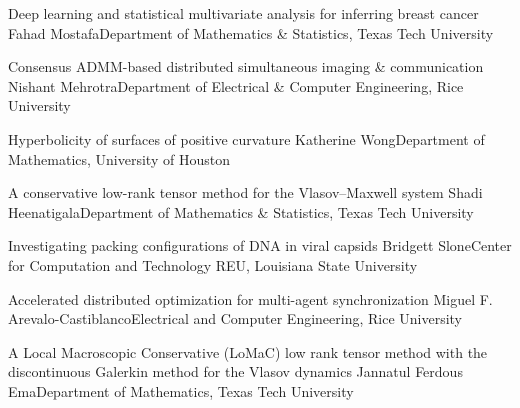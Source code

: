 \begin{posters}
\item\poster
{Deep learning and statistical multivariate analysis for inferring breast cancer}
{Fahad Mostafa}{Department of Mathematics \& Statistics, Texas Tech University}

\item\poster
{Consensus ADMM-based distributed simultaneous imaging \& communication}
{Nishant Mehrotra}{Department of Electrical \& Computer Engineering, Rice University}

\item\poster
{Hyperbolicity of surfaces of positive curvature}
{Katherine Wong}{Department of Mathematics, University of Houston}

\item\poster
{A conservative low-rank tensor method for the Vlasov–Maxwell system}
{Shadi Heenatigala}{Department of Mathematics \& Statistics, Texas Tech University}

\item\poster
{Investigating packing configurations of DNA in viral capsids}
{Bridgett Slone}{Center for Computation and Technology REU, Louisiana State University}


\item\poster
{Accelerated distributed optimization for multi-agent synchronization}
{Miguel F. Arevalo-Castiblanco}{Electrical and Computer Engineering, Rice University}


\item\poster
{A Local Macroscopic Conservative (LoMaC) low rank tensor method with the discontinuous Galerkin method for the Vlasov dynamics}
{Jannatul Ferdous Ema}{Department of Mathematics, Texas Tech University}

\end{posters}


\room
